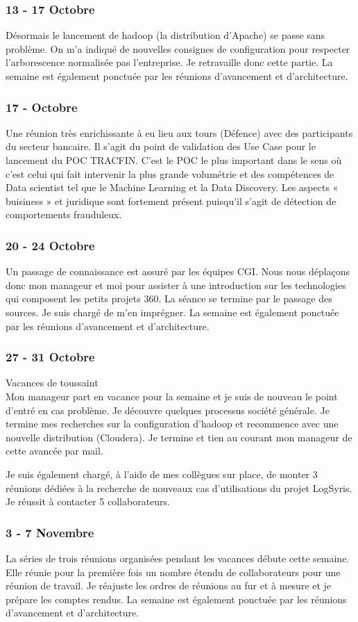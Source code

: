 \subsubsection*{13 - 17 Octobre}
Désormais le lancement de hadoop (la distribution d’Apache)  se passe sans problème. On m’a indiqué de nouvelles consignes de configuration pour respecter l’arborescence normalisée pas l’entreprise. Je retravaille donc cette partie. La semaine est également ponctuée par les réunions d’avancement et d’architecture.
\subsubsection*{17 -  Octobre}
Une réunion très enrichissante à eu lieu aux tours (Défence) avec des participants du secteur bancaire. Il s’agit du point de validation des Use Case pour le lancement du POC TRACFIN. C’est le POC le plus important dans le sens où c’est celui qui fait intervenir la plus grande volumétrie et des compétences de Data scientist tel que le Machine Learning et la Data Discovery. Les aspects « buisiness » et juridique sont fortement présent puisqu’il s’agit de détection de comportements frauduleux.
\subsubsection*{20 - 24 Octobre}
Un passage de connaissance est assuré par les équipes CGI. Nous nous déplaçons donc mon manageur et moi pour assister à une introduction sur les technologies qui composent les petits projets 360. La séance se termine par le passage des sources. Je suis chargé de m’en imprégner. La semaine est également ponctuée par les réunions d’avancement et d’architecture.
\subsubsection*{27 - 31 Octobre}
Vacances  de toussaint \\
Mon manageur part en vacance pour la semaine et je suis de nouveau le point d’entré en cas problème.  Je découvre quelques processus société générale. Je termine mes recherches sur la configuration d’hadoop et recommence avec une nouvelle distribution (Cloudera). Je termine et tien au courant mon manageur de cette avancée par mail.

Je suis également chargé, à l’aide de mes collègues sur place, de monter 3 réunions dédiées à la recherche de nouveaux cas d’utilisations du projet LogSyris. Je réussit à contacter 5 collaborateurs.
\subsubsection*{3 - 7 Novembre}
La séries de trois réunions organisées pendant les vacances débute cette semaine. Elle réunie pour la première fois un nombre étendu de collaborateurs pour une réunion de travail. Je réajuste les ordres de réunions au fur et à mesure et je prépare les comptes rendus. La semaine est également ponctuée par les réunions d’avancement et d’architecture.

